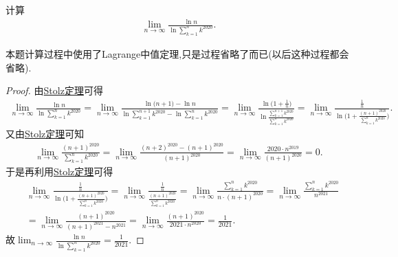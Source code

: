\documentclass[../../main.tex]{subfiles}
\begin{document}
\begin{example}
计算
\begin{align*}
\lim_{n \to \infty} \frac{\ln n}{\ln \sum\limits_{k = 1}^{n} k^{2020}}.
\end{align*}
\end{example}
\begin{note}
本题计算过程中使用了Lagrange中值定理,只是过程省略了而已(以后这种过程都会省略).
\end{note}
\begin{proof}
由\hyperref[theorem:Stolz定理]{Stolz定理}可得
\begin{align*}
\lim_{n \to \infty} \frac{\ln n}{\ln \sum\limits_{k = 1}^{n} k^{2020}}=\lim_{n\rightarrow \infty} \frac{\ln\mathrm{(}n+1)-\ln n}{\ln \sum\limits_{k=1}^{n+1}{k^{2020}}-\ln \sum\limits_{k=1}^n{k^{2020}}}=\lim_{n\rightarrow \infty} \frac{\ln\mathrm{(}1+\frac{1}{n})}{\ln \frac{\sum\limits_{k=1}^{n+1}{k^{2020}}}{\sum\limits_{k=1}^n{k^{2020}}}}=\lim_{n\rightarrow \infty} \frac{\frac{1}{n}}{\ln\mathrm{(}1+\frac{(n+1)^{2020}}{\sum\limits_{k=1}^n{k^{2020}}})}.
\end{align*}
又由\hyperref[theorem:Stolz定理]{Stolz定理}可知
\begin{align*}
\lim_{n\rightarrow \infty} \frac{(n+1)^{2020}}{\sum\limits_{k=1}^n{k^{2020}}}=\lim_{n\rightarrow \infty} \frac{(n+2)^{2020}-(n+1)^{2020}}{(n+1)^{2020}}=\lim_{n\rightarrow \infty} \frac{2020\cdot n^{2019}}{(n+1)^{2020}}=0.
\end{align*}
于是再利用\hyperref[theorem:Stolz定理]{Stolz定理}可得
\begin{align*}
&\lim_{n\rightarrow \infty} \frac{\frac{1}{n}}{\ln\mathrm{(}1+\frac{(n+1)^{2020}}{\sum\limits_{k=1}^n{k^{2020}}})}=\lim_{n\rightarrow \infty} \frac{\frac{1}{n}}{\frac{(n+1)^{2020}}{\sum\limits_{k=1}^n{k^{2020}}}}=\lim_{n\rightarrow \infty} \frac{\sum\limits_{k=1}^n{k^{2020}}}{n\cdot (n+1)^{2020}}=\lim_{n\rightarrow \infty} \frac{\sum\limits_{k=1}^n{k^{2020}}}{n^{2021}}  \\
&=\lim_{n\rightarrow \infty} \frac{(n+1)^{2020}}{(n+1)^{2021}-n^{2021}}=\lim_{n\rightarrow \infty} \frac{(n+1)^{2020}}{2021\cdot n^{2020}}=\frac{1}{2021}.
\end{align*}
故$\lim_{n \to \infty} \frac{\ln n}{\ln \sum\limits_{k = 1}^{n} k^{2020}}=\frac{1}{2021}$.

\end{proof}
\end{document}
